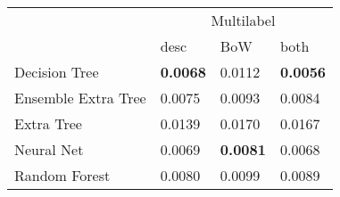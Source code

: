 \begin{tabular}{|l|l|l|l| }
\hline
 &  \multicolumn{3}{c|}{Multilabel} \\
\cline{2-4} & desc & BoW & both \\ \hline
Decision Tree       & {\bf 0.0068} & 0.0112 & {\bf 0.0056}\\
Ensemble Extra Tree & 0.0075 & 0.0093 & 0.0084\\
Extra Tree          & 0.0139 & 0.0170 & 0.0167\\
Neural Net          & 0.0069 & {\bf 0.0081} & 0.0068\\
Random Forest       & 0.0080 & 0.0099 & 0.0089\\
\hline
\end{tabular}